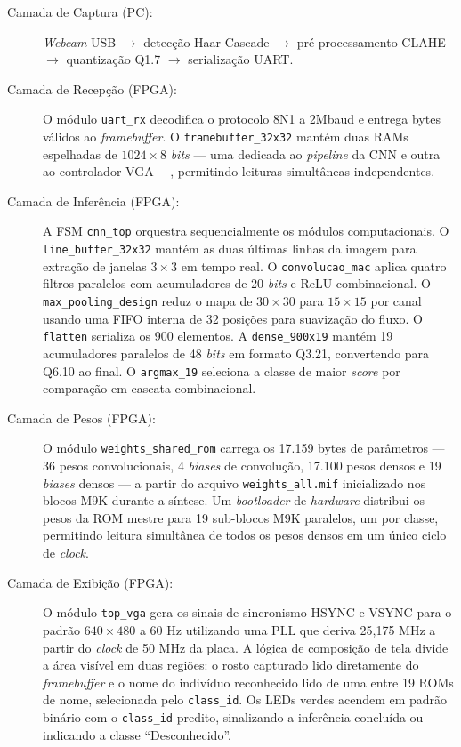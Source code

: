 \begin{description}
    \item[Camada de Captura (PC):] \textit{Webcam} USB $\rightarrow$ detecção Haar Cascade $\rightarrow$ pré-processamento CLAHE $\rightarrow$ quantização Q1.7 $\rightarrow$ serialização UART.
    \item[Camada de Recepção (FPGA):] O módulo \texttt{uart\_rx} decodifica o protocolo 8N1 a 2Mbaud e entrega bytes válidos ao \textit{framebuffer}. O \texttt{framebuffer\_32x32} mantém duas RAMs espelhadas de $1024 \times 8$ \textit{bits} — uma dedicada ao \textit{pipeline} da CNN e outra ao controlador VGA —, permitindo leituras simultâneas independentes.
    \item[Camada de Inferência (FPGA):] A FSM \texttt{cnn\_top} orquestra sequencialmente os módulos computacionais. O \texttt{line\_buffer\_32x32} mantém as duas últimas linhas da imagem para extração de janelas $3 \times 3$ em tempo real. O \texttt{convolucao\_mac} aplica quatro filtros paralelos com acumuladores de 20 \textit{bits} e ReLU combinacional. O \texttt{max\_pooling\_design} reduz o mapa de $30 \times 30$ para $15 \times 15$ por canal usando uma FIFO interna de 32 posições para suavização do fluxo. O \texttt{flatten} serializa os 900 elementos. A \texttt{dense\_900x19} mantém 19 acumuladores paralelos de 48 \textit{bits} em formato Q3.21, convertendo para Q6.10 ao final. O \texttt{argmax\_19} seleciona a classe de maior \textit{score} por comparação em cascata combinacional.
    \item[Camada de Pesos (FPGA):] O módulo \texttt{weights\_shared\_rom} carrega os 17.159 bytes de parâmetros — 36 pesos convolucionais, 4 \textit{biases} de convolução, 17.100 pesos densos e 19 \textit{biases} densos — a partir do arquivo \texttt{weights\_all.mif} inicializado nos blocos M9K durante a síntese. Um \textit{bootloader} de \textit{hardware} distribui os pesos da ROM mestre para 19 sub-blocos M9K paralelos, um por classe, permitindo leitura simultânea de todos os pesos densos em um único ciclo de \textit{clock}.
    \item[Camada de Exibição (FPGA):] O módulo \texttt{top\_vga} gera os sinais de sincronismo HSYNC e VSYNC para o padrão $640 \times 480$ a 60 Hz utilizando uma PLL que deriva 25,175 MHz a partir do \textit{clock} de 50 MHz da placa. A lógica de composição de tela divide a área visível em duas regiões: o rosto capturado lido diretamente do \textit{framebuffer} e o nome do indivíduo reconhecido lido de uma entre 19 ROMs de nome, selecionada pelo \texttt{class\_id}. Os LEDs verdes acendem em padrão binário com o \texttt{class\_id} predito, sinalizando a inferência concluída ou indicando a classe ``Desconhecido''.
\end{description}

